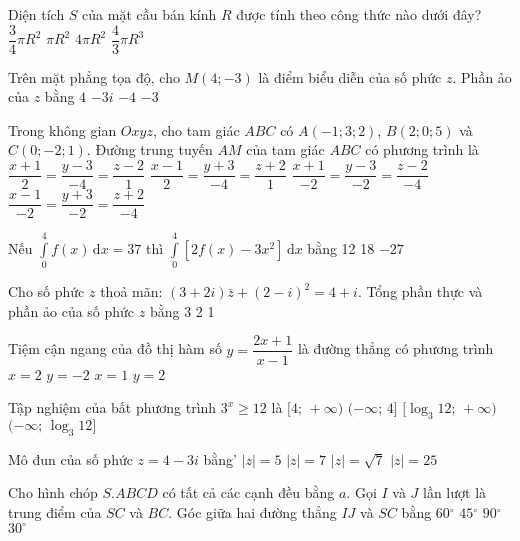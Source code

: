 \begin{ex} %
Diện tích $S$ của mặt cầu bán kính $R$ được tính theo công thức nào dưới đây?
\choice 
{ $\dfrac{3}{4}\pi {{R}^2}$ }
{ $\pi {{R}^2}$ }
{ \True $4\pi {{R}^2}$ }
{ $\dfrac{4}{3}\pi {{R}^3}$ } \end{ex} 
\begin{ex} %
Trên mặt phẳng tọa độ, cho $M( 4;-3 )$ là điểm biểu diễn của số phức $z$. Phần ảo của $z$ bằng
\choice 
{ $4$ }
{ $-3i$}
{ $-4$}
{ \True $-3$} \end{ex} 
\begin{ex} %
Trong không gian $Oxyz$, cho tam giác $ABC$ có $A(-1;3;2)$, $B(2;0;5)$ và $C(0;-2;1)$. Đường trung tuyến $AM$ của tam giác $ABC$ có phương trình là
\choice 
{ \True $\dfrac{x+1}{2}=\dfrac{y-3}{-4}=\dfrac{z-2}{1}$}
{ $\dfrac{x-1}{2}=\dfrac{y+3}{-4}=\dfrac{z+2}{1}$} 
{ $\dfrac{x+1}{-2}=\dfrac{y-3}{-2}=\dfrac{z-2}{-4}$}
{ $\dfrac{x-1}{-2}=\dfrac{y+3}{-2}=\dfrac{z+2}{-4}$} \end{ex} 
\begin{ex} %
Nếu $\int\limits_0^4{f(x)}\,\mathrm{d} x=37$ thì $\int\limits_0^4{[ 2f(x)-3x^2 ]}\,\mathrm{d} x$ bằng
\choice 
{ 12}
{ 18}
{ $-27$}
{ } \end{ex} 
\begin{ex} %
Cho số phức $z$ thoả mãn: $(3+2i)\bar{z}+{{(2-i)}^2}=4+i$. Tổng phần thực và phần ảo của số phức $z$ bằng
\choice 
{ 3}
{ }
{ 2}
{ 1} \end{ex} 
\begin{ex} %
Tiệm cận ngang của đồ thị hàm số $y=\dfrac{2x+1}{x-1}$ là đường thẳng có phương trình
\choice 
{ $x=2$}
{ $y=-2$}
{ $x=1$}
{ \True $y=2$} \end{ex} 
\begin{ex} %
Tập nghiệm của bất phương trình ${{3}^{x}}\ge 12$ là
\choice 
{ $[ 4;\,+\infty )$}
{ $( -\infty;\,4 ]$}
{ \True $[ {{\log }_{3}}12;\,+\infty )$}
{ $( -\infty;\,{{\log }_{3}}12 ]$} \end{ex} 
\begin{ex} %
Mô đun của số phức $z=4-3i$ bằng'
\choice 
{ \True $| z |=5$}
{ $| z |=7$}
{ $| z |=\sqrt{7}$}
{ $| z |=25$} \end{ex} 
\begin{ex} %
Cho hình chóp $S.ABCD$ có tất cả các cạnh đều bằng $a$. Gọi $I$ và $J$ lần lượt là trung điểm của $SC$ và $BC$. Góc giữa hai đường thẳng $IJ$ và $SC$ bằng
\choice 
{ \True $60{}^\circ $}
{ $45{}^\circ $}
{ $90{}^\circ $}
{ $30{}^\circ $} \end{ex} 
